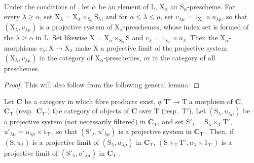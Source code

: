 \begin{proposition}[8.2.5]
\label{IV.8.2.5}
Under the conditions of , let $\alpha$ be an element of $\mathrm{L}$, $\mathrm{X}_\alpha$ an $\mathrm{S}_\alpha$-prescheme.
For every $\lambda\geqslant\alpha$, set $\mathrm{X}_\lambda=\mathrm{X}_\alpha\times_{\mathrm{S}_\alpha}\mathrm{S}_\lambda$, and for $\alpha\leqslant\lambda\leqslant\mu$, set $v_{\lambda\mu}=1_{\mathrm{X}_\alpha}\times u_{\lambda\mu}$, so that $(\mathrm{X}_\lambda,v_{\lambda\mu})$ is a projective system of $\mathrm{X}_\alpha$-preschemes, whose index set is formed of the $\lambda\geqslant\alpha$ in $\mathrm{L}$.
Set likewise $\mathrm{X}=\mathrm{X}_\alpha\times_{\mathrm{S}_\alpha}\mathrm{S}$ and $v_\lambda=1_{\mathrm{X}_\alpha}\times u_\lambda$.
Then the $\mathrm{X}_\alpha$-morphisms $v_\lambda:\mathrm{X}\to\mathrm{X}_\lambda$ make $\mathrm{X}$ a projective limit of the projective system $(\mathrm{X}_\lambda,v_{\lambda\mu})$ in the category of $\mathrm{X}_\alpha$-preschemes, or in the category of all preschemes.
\end{proposition}

\begin{proof}
This will also follow from the following general lemma:
\end{proof}

\begin{lemma}[8.2.6]
\label{IV.8.2.6}
Let $\boldsymbol{C}$ be a category in which fibre products exist, $q:\mathrm{T}'\to\mathrm{T}$ a morphism of $\boldsymbol{C}$, $\boldsymbol{C}_\mathrm{T}$ (\textup{resp.}\ $\boldsymbol{C}_{\mathrm{T}'}$) the category of objects of $\boldsymbol{C}$ over
$\mathrm{T}$ \textup{(resp.\ $\mathrm{T}'$)}.
Let $(\mathrm{S}_\lambda,u_{\lambda\mu})$ be a projective system (not necessarily filtered) in $\boldsymbol{C}_\mathrm{T}$, and set $\mathrm{S}'_\lambda=\mathrm{S}_\lambda\times_\mathrm{T}\mathrm{T}'$, $u'_{\lambda\mu}=u_{\lambda\mu}\times 1_{\mathrm{T}'}$, so that $(\mathrm{S}'_\lambda,u'_{\lambda\mu})$ is a projective system in $\boldsymbol{C}_{\mathrm{T}'}$.
Then, if $(\mathrm{S},u_\lambda)$ is a projective limit of $(\mathrm{S}_\lambda,u_{\lambda\mu})$ in $\boldsymbol{C}_\mathrm{T}$, $(\mathrm{S}\times_\mathrm{T}\mathrm{T}',u_\lambda\times 1_{\mathrm{T}'})$ is a projective limit of $(\mathrm{S}'_\lambda,u'_{\lambda\mu})$ in $\boldsymbol{C}_{\mathrm{T}'}$.
\end{lemma}

